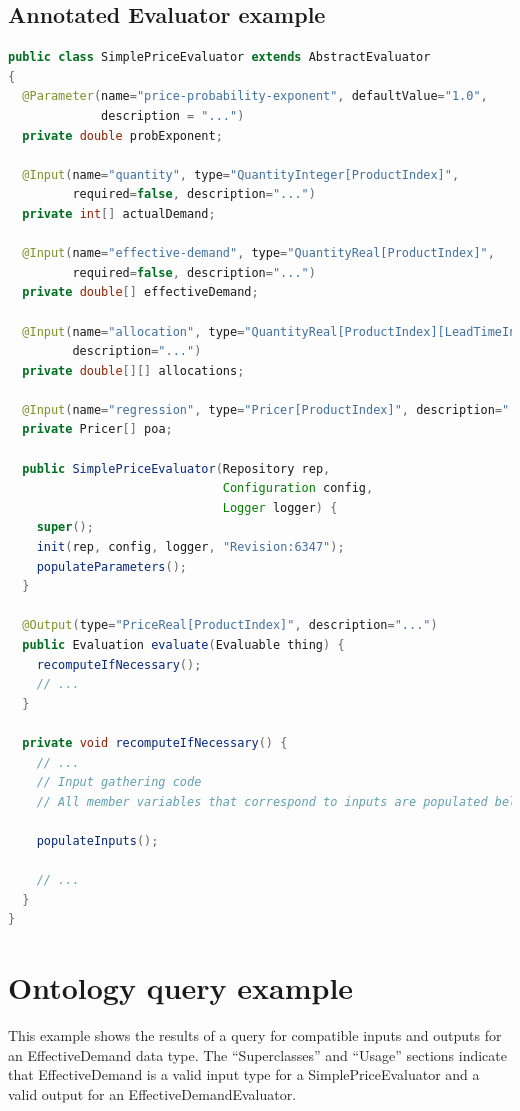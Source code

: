 \documentclass{article}
\begin{document}
\clearpage
\subsection{Annotated Evaluator example}
\label{sec:annotatedeval}

{\small
\begin{lstlisting}[language={Java}]
public class SimplePriceEvaluator extends AbstractEvaluator
{
  @Parameter(name="price-probability-exponent", defaultValue="1.0",
             description = "...")
  private double probExponent;

  @Input(name="quantity", type="QuantityInteger[ProductIndex]",
         required=false, description="...")
  private int[] actualDemand;

  @Input(name="effective-demand", type="QuantityReal[ProductIndex]",
         required=false, description="...")
  private double[] effectiveDemand;

  @Input(name="allocation", type="QuantityReal[ProductIndex][LeadTimeInteger]",
         description="...")
  private double[][] allocations;

  @Input(name="regression", type="Pricer[ProductIndex]", description="...")
  private Pricer[] poa;

  public SimplePriceEvaluator(Repository rep,
                              Configuration config,
                              Logger logger) {
    super();
    init(rep, config, logger, "Revision:6347");
    populateParameters();
  }

  @Output(type="PriceReal[ProductIndex]", description="...")
  public Evaluation evaluate(Evaluable thing) {
    recomputeIfNecessary();
    // ...
  }

  private void recomputeIfNecessary() {
    // ...
    // Input gathering code
    // All member variables that correspond to inputs are populated below.

    populateInputs();

    // ...
  }
}
\end{lstlisting}
}

\clearpage
\section{Ontology query example}
\label{sec:ontology-query}

This example shows the results of a query for compatible inputs and outputs for an EffectiveDemand data type.
The ``Superclasses'' and ``Usage'' sections indicate that EffectiveDemand is a valid input type for a SimplePriceEvaluator and a valid output for an EffectiveDemandEvaluator.
\end{document}
